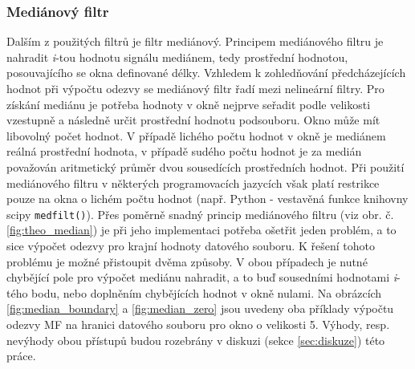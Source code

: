\documentclass[a4paper, 12pt]{article}
\begin{document}
\subsubsection{Mediánový filtr}
\label{sec:filtr3}
Dalším z použitých filtrů je filtr mediánový. Principem mediánového filtru je nahradit \textit{i}-tou hodnotu signálu mediánem, tedy prostřední hodnotou, posouvajícího se okna definované délky. Vzhledem k zohledňování předcházejících hodnot při výpočtu odezvy se mediánový filtr řadí mezi nelineární filtry. Pro získání mediánu je potřeba hodnoty v okně nejprve seřadit podle velikosti vzestupně a následně určit prostřední hodnotu podsouboru. Okno může mít libovolný počet hodnot. V případě lichého počtu hodnot v okně je mediánem reálná prostřední hodnota, v případě sudého počtu hodnot je za medián považován aritmetický průměr dvou sousedících prostředních hodnot. Při použití mediánového filtru v některých programovacích jazycích však platí restrikce pouze na okna o lichém počtu hodnot (např. Python - vestavěná funkce knihovny scipy \texttt{medfilt()}). Přes poměrně snadný princip mediánového filtru (viz obr. č. \ref{fig:theo_median}) je při jeho implementaci potřeba ošetřit jeden problém, a to sice výpočet odezvy pro krajní hodnoty datového souboru. K řešení tohoto problému je možné přistoupit dvěma způsoby. V obou případech je nutné chybějící pole pro výpočet mediánu nahradit, a to buď sousedními hodnotami \textit{i}-tého bodu, nebo doplněním chybějících hodnot v okně nulami. Na obrázcích \ref{fig:median_boundary} a \ref{fig:median_zero} jsou uvedeny oba příklady výpočtu odezvy MF na hranici datového souboru pro okno o velikosti 5. Výhody, resp. nevýhody obou přístupů budou rozebrány v diskuzi (sekce \ref{sec:diskuze}) této práce.\vspace{6cm}
\end{document}
